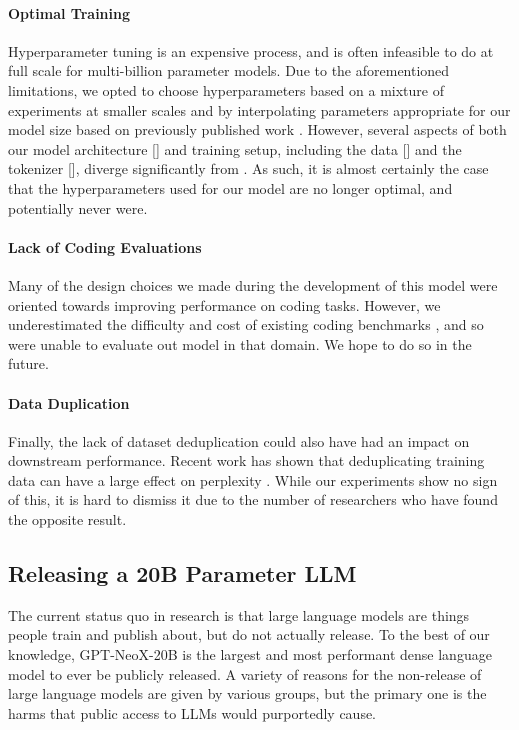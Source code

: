 \documentclass[11pt]{article}
\newcommand{\model}{GPT-NeoX-20B}
\begin{document}
\paragraph{Optimal Training} Hyperparameter tuning is an expensive process, and is often infeasible to do at full scale for multi-billion parameter models. Due to the aforementioned limitations, we opted to choose hyperparameters based on a mixture of experiments at smaller scales and by interpolating parameters appropriate for our model size based on previously published work \citep{brown2020language}. However, several aspects of both our model architecture [] and training setup, including the data [] and the tokenizer [], diverge significantly from \citet{brown2020language}. As such, it is almost certainly the case that the hyperparameters used for our model are no longer optimal, and potentially never were.

\paragraph{Lack of Coding Evaluations} Many of the design choices we made during the development of this model were oriented towards improving performance on coding tasks. However, we underestimated the difficulty and cost of existing coding benchmarks \citep{chen2021evaluating}, and so were unable to evaluate out model in that domain. We hope to do so in the future.

\paragraph{Data Duplication} Finally, the lack of dataset deduplication could also have had an impact on downstream performance. Recent work has shown that deduplicating training data can have a large effect on perplexity \citep{lee2021deduplicating}. While our experiments show no sign of this, it is hard to dismiss it due to the number of researchers who have found the opposite result.

\subsection{Releasing a 20B Parameter LLM}

The current status quo in research is that large language models are things people train and publish about, but do not actually release. To the best of our knowledge, \model{} is the largest and most performant dense language model to ever be publicly released. A variety of reasons for the non-release of large language models are given by various groups, but the primary one is the harms that public access to LLMs would purportedly cause.
\end{document}
